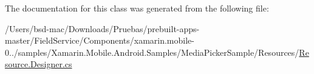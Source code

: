 The documentation for this class was generated from the following file\+:\begin{DoxyCompactItemize}
\item 
/\+Users/bsd-\/mac/\+Downloads/\+Pruebas/prebuilt-\/apps-\/master/\+Field\+Service/\+Components/xamarin.\+mobile-\/0../samples/\+Xamarin.\+Mobile.\+Android.\+Samples/\+Media\+Picker\+Sample/\+Resources/\hyperlink{_components_2xamarin_8mobile-0_86_81_2samples_2_xamarin_8_mobile_8_android_8_samples_2_media_picb4289798373573612b81d1923e7d12fa}{Resource.\+Designer.\+cs}\end{DoxyCompactItemize}
